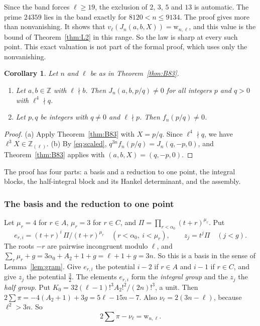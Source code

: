\documentclass[11pt]{amsart}
\newtheorem{corollary}[theorem]{Corollary}
\theoremstyle{definition}
\theoremstyle{remark}
\numberwithin{equation}{section}
\newcommand{\Z}{\mathbb Z}
\begin{document}
Since the band forces $\ell\ge19$, the exclusion of $2$, $3$, $5$ and $13$ is automatic. The prime $24359$ lies in the
band exactly for $8120<n\le9134$. The proof gives more than nonvanishing. It shows that
$v_\ell(J_n(a,b,X))=\mathrm{w}_{n,\ell}$, and this value is the bound of Theorem~\ref{thm:L2} in this range. So the
law is sharp at every such point. This exact valuation is not part of the formal proof, which uses only the
nonvanishing.

\begin{corollary}\label{cor:B83}
Let $n$ and $\ell$ be as in Theorem~\ref{thm:B83}.
\begin{enumerate}[label=(\alph*)]
\item Let $a,b\in\Z$ with $\ell\nmid b$. Then $J_n(a,b,p/q)\ne0$ for all integers $p$ and $q>0$ with $\ell^4\nmid q$.
\item Let $p,q$ be integers with $q\ne0$ and $\ell\nmid p$. Then $f_n(p/q)\ne0$.
\end{enumerate}
\end{corollary}

\begin{proof}
(a) Apply Theorem~\ref{thm:B83} with $X=p/q$. Since $\ell^4\nmid q$, we have $\ell^3X\in\Z_{(\ell)}$. (b) By \eqref{eq:scaled}, $q^{3n}f_n(p/q)=J_n(q,-p,0)$, and
Theorem~\ref{thm:B83} applies with $(a,b,X)=(q,-p,0)$.
\end{proof}

The proof has four parts: a basis and a reduction to one point, the integral blocks, the half-integral block and its
Hankel determinant, and the assembly.

\subsubsection{The basis and the reduction to one point}
Let $\mu_r=4$ for $r\in A$, $\mu_r=3$ for $r\in C$, and $\Pi=\prod_{r<\alpha_0}(t+r)^{\mu_r}$. Put
\[
 e_{r,i}=(t+r)^i\,\Pi/(t+r)^{\mu_r}\quad(r<\alpha_0,\ i<\mu_r),\qquad z_j=t^j\Pi\quad(j<g).
\]
The roots $-r$ are pairwise incongruent modulo $\ell$, and $\sum_r\mu_r+g=3\alpha_0+A_2+1+g=\ell+1+g=3n$. So this is a
basis in the sense of Lemma~\ref{lem:gram}. Give $e_{r,i}$ the potential $i-2$ if $r\in A$ and $i-1$ if $r\in C$, and give
$z_j$ the potential $\frac32$. The elements $e_{r,i}$ form the \emph{integral group} and the $z_j$ the
\emph{half group}. Put $K_0=32(\ell-1)!^3A_2!^2/(2n)!^3$, a unit. Then $2\sum\pi=-4(A_2+1)+3g=5\ell-15n-7$. Also $\nu_\ell=2(3n-\ell)$, because $\ell^2>3n$. So
\begin{equation}\label{eq:target}
 2\sum\pi-\nu_\ell=\mathrm{w}_{n,\ell}.
\end{equation}
\end{document}
